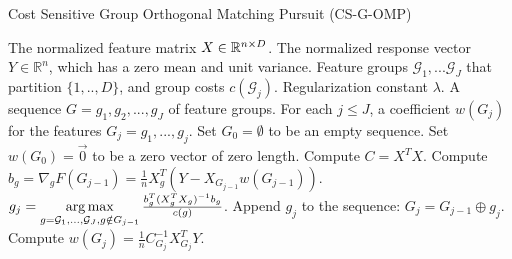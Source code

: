 %
%

\begin{algorithm}[tb]
\caption{Cost Sensitive Group Orthogonal Matching Pursuit (CS-G-OMP)}
 \label{algo:gomp_lm}
\begin{algorithmic}[1]
	 The normalized feature matrix $X \in \mathbb{R}^{n \times D}$.
 	The normalized response vector $Y \in \mathbb{R}^{n}$, which has a zero mean and unit variance. 
    Feature groups $\mathcal{G}_1, ... \mathcal{G}_J$ that partition $\{1,..,D\}$, and group costs $c(\mathcal{G}_j)$.
   Regularization constant $\lambda$.
	 A sequence $G = g_1, g_2, ..., g_{J}$ of feature groups.
   For each $j \leq J$, a coefficient  $w(G_j)$ for the features $G_j =g_1,..., g_j$. 
    \STATE Set $G_0 = \emptyset$ to be an empty sequence.
    \STATE Set $w(G_0) = \vec{0}$ to be a zero vector of zero length.
    \STATE Compute $C = X^TX$. 
        \STATE Compute $b_g = \nabla _g F(G_{j-1}) = \frac{1}{n} X_g^T(Y-X_{G_{j-1}}w(G_{j-1}))$.
        \label{algline:gomp_bg}
    \ENDFOR
    \STATE $g_{j} = \operatorname*{arg\,max} \limits_{g = \mathcal{G}_1, ... , \mathcal{G}_J, g\notin G_{j-1}} \frac{b_g ^T (X_{g}^TX_g)^{-1}b_g}{ c(g) }$.
   \STATE Append $g_j$ to the sequence: $G_{j} = G_{j-1} \oplus g_{j}$.
   \STATE Compute $w(G_j) = \frac{1}{n}C_{G_{j}}^{-1}X_{G_{j}}^TY$.
 \ENDFOR
\end{algorithmic}
\end{algorithm}



